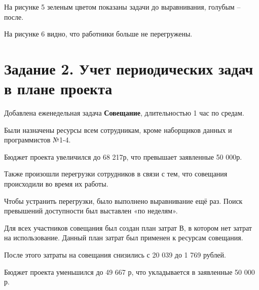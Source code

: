
На рисунке 5 зеленым цветом показаны задачи до выравнивания, голубым – после.


На рисунке 6 видно, что работники больше не перегружены.

\newpage
\section*{Задание 2. Учет периодических задач в плане проекта}

Добавлена еженедельная задача \textbf{Совещание}, длительностью 1 час по средам.


\newpage
Были назначены ресурсы всем сотрудникам, кроме наборщиков данных и программистов №1-4.



Бюджет проекта увеличился до 68 217р, что превышает заявленные 50 000р.


Также произошли перегрузки сотрудников в связи с тем, что совещания происходили во время их работы.

\newpage
Чтобы устранить перегрузки, было выполнено выравнивание ещё раз. Поиск превышений доступности был выставлен «по неделям».


Для всех участников совещания был создан план затрат В, в котором нет затрат на использование. Данный план затрат был применен к ресурсам совещания.


\newpage
После этого затраты на совещания снизились с 20 039 до 1 769 рублей.


Бюджет проекта уменьшился до 49 667 р, что укладывается в заявленные 50 000 р.


